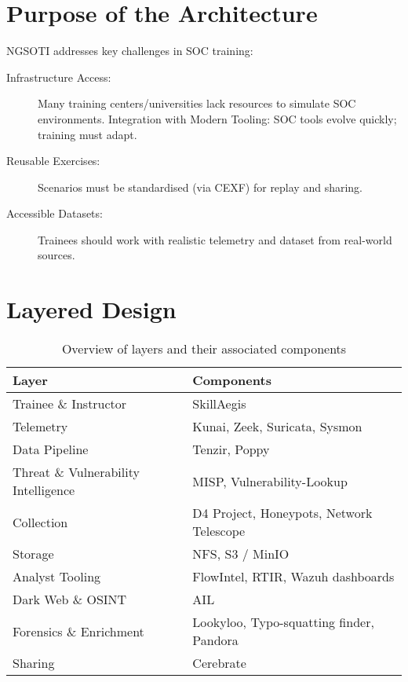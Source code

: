\documentclass[10pt,a4paper]{report}
\begin{document}
\section{Purpose of the Architecture}

NGSOTI addresses key challenges in SOC training:

\begin{description}
    \item [Infrastructure Access:] Many training centers/universities lack resources to simulate SOC environments.
    Integration with Modern Tooling: SOC tools evolve quickly; training must adapt.
    \item [Reusable Exercises:] Scenarios must be standardised (via CEXF) for replay and sharing.
    \item [Accessible Datasets:] Trainees should work with realistic telemetry and dataset from real-world sources.
\end{description}

\section{Layered Design}

\begin{table}[h!]
\centering
\begin{tabularx}{\textwidth}{|l|X|}
\hline
\textbf{Layer} & \textbf{Components} \\
\hline
Trainee \& Instructor & SkillAegis \\
\hline
Telemetry & Kunai, Zeek, Suricata, Sysmon \\
\hline
Data Pipeline & Tenzir, Poppy \\
\hline
Threat \& Vulnerability Intelligence & MISP, Vulnerability-Lookup \\
\hline
Collection & D4 Project, Honeypots, Network Telescope \\
\hline
Storage & NFS, S3 / MinIO \\
\hline
Analyst Tooling & FlowIntel, RTIR, Wazuh dashboards \\
\hline
Dark Web \& OSINT & AIL \\
\hline
Forensics \& Enrichment & Lookyloo, Typo-squatting finder, Pandora \\
\hline
Sharing & Cerebrate \\
\hline
\end{tabularx}
\caption{Overview of layers and their associated components}
\label{tab:layers-components}
\end{table}
\end{document}
